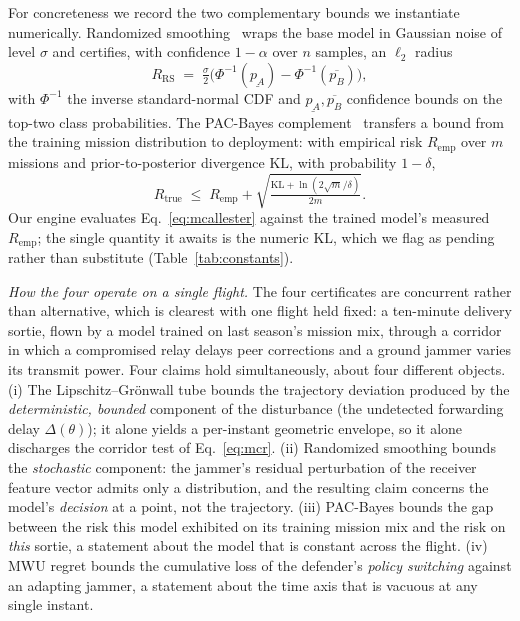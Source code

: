 For concreteness we record the two complementary bounds we instantiate
numerically. Randomized smoothing~\cite{cohen2019smoothing} wraps the base model
in Gaussian noise of level $\sigma$ and certifies, with confidence $1-\alpha$
over $n$ samples, an $\ell_2$ radius
\begin{equation}
\label{eq:cohen}
R_{\mathrm{RS}} \;=\; \tfrac{\sigma}{2}\big(\Phi^{-1}(\underline{p_A})-\Phi^{-1}(\overline{p_B})\big),
\end{equation}
with $\Phi^{-1}$ the inverse standard-normal CDF and
$\underline{p_A},\overline{p_B}$ confidence bounds on the top-two class
probabilities. The PAC-Bayes
complement~\cite{mcallester1999pac,viallard2021pacbayes} transfers a bound from
the training mission distribution to deployment: with empirical risk
$R_{\mathrm{emp}}$ over $m$ missions and prior-to-posterior divergence
$\mathrm{KL}$, with probability $1-\delta$,
\begin{equation}
\label{eq:mcallester}
R_{\mathrm{true}} \;\le\; R_{\mathrm{emp}} + \sqrt{\tfrac{\mathrm{KL}+\ln(2\sqrt{m}/\delta)}{2m}}.
\end{equation}
Our engine evaluates Eq.~\eqref{eq:mcallester} against the trained model's measured
$R_{\mathrm{emp}}$; the single quantity it awaits is the numeric $\mathrm{KL}$,
which we flag as pending rather than substitute (Table~\ref{tab:constants}).

\emph{How the four operate on a single flight.} The four certificates are
concurrent rather than alternative, which is clearest with one flight held
fixed: a ten-minute delivery sortie, flown by a model trained on last season's
mission mix, through a corridor in which a compromised relay delays peer
corrections and a ground jammer varies its transmit power. Four claims hold
simultaneously, about four different objects. (i) The Lipschitz--Gr\"onwall tube
bounds the trajectory deviation produced by the \emph{deterministic, bounded}
component of the disturbance (the undetected forwarding delay $\Delta(\theta)$);
it alone yields a per-instant geometric envelope, so it alone discharges the
corridor test of Eq.~\eqref{eq:mcr}. (ii) Randomized smoothing bounds the
\emph{stochastic} component: the jammer's residual perturbation of the receiver
feature vector admits only a distribution, and the resulting claim concerns the
model's \emph{decision} at a point, not the trajectory. (iii) PAC-Bayes bounds
the gap between the risk this model exhibited on its training mission mix and
the risk on \emph{this} sortie, a statement about the model that is constant
across the flight. (iv) MWU regret bounds the cumulative loss of the defender's
\emph{policy switching} against an adapting jammer, a statement about the time
axis that is vacuous at any single instant.

